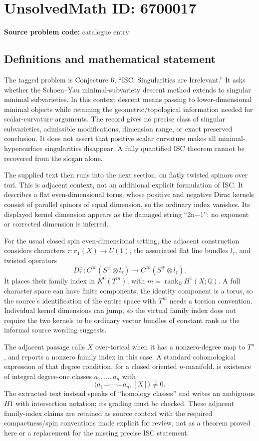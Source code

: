 \documentclass[11pt]{article}
\newcommand{\Q}{\mathbb{Q}}
\begin{document}
\section*{UnsolvedMath ID: 6700017}
\textbf{Source problem code:} catalogue entry
\subsection{Definitions and mathematical statement}
The tagged problem is Conjecture 6, ``ISC: Singularities are Irrelevant.'' It asks whether the Schoen--Yau minimal-subvariety descent method extends to singular minimal subvarieties. In this context descent means passing to lower-dimensional minimal objects while retaining the geometric/topological information needed for scalar-curvature arguments. The record gives no precise class of singular subvarieties, admissible modifications, dimension range, or exact preserved conclusion. It does not assert that positive scalar curvature makes all minimal-hypersurface singularities disappear. A fully quantified ISC theorem cannot be recovered from the slogan alone.

The supplied text then runs into the next section, on flatly twisted spinors over tori. This is adjacent context, not an additional explicit formulation of ISC. It describes a flat even-dimensional torus, whose positive and negative Dirac kernels consist of parallel spinors of equal dimension, so the ordinary index vanishes. Its displayed kernel dimension appears as the damaged string ``2n−1''; no exponent or corrected dimension is inferred.

For the usual closed spin even-dimensional setting, the adjacent construction considers characters $\tau:\pi_1(X)\to U(1)$, the associated flat line bundles $l_\tau$, and twisted operators
\[
 D_\tau^\pm:C^\infty(S^\pm\otimes l_\tau)
                \longrightarrow C^\infty(S^\mp\otimes l_\tau).
\]
It places their family index in $K^0(T^m)$, with $m=\operatorname{rank}_{\Q}H^1(X;\Q)$. A full character space can have finite components; the identity component is a torus, so the source's identification of the entire space with $T^m$ needs a torsion convention. Individual kernel dimensions can jump, so the virtual family index does not require the two kernels to be ordinary vector bundles of constant rank as the informal source wording suggests.

The adjacent passage calls $X$ over-torical when it has a nonzero-degree map to $T^n$, and reports a nonzero family index in this case. A standard cohomological expression of that degree condition, for a closed oriented $n$-manifold, is existence of integral degree-one classes $a_1,\ldots,a_n$ with
\[
 \langle a_1\smile\cdots\smile a_n,[X]\rangle\ne0.
\]
The extracted text instead speaks of ``homology classes'' and writes an ambiguous $H1$ with intersection notation; its grading must be checked. These adjacent family-index claims are retained as source context with the required compactness/spin conventions made explicit for review, not as a theorem proved here or a replacement for the missing precise ISC statement.
\end{document}

